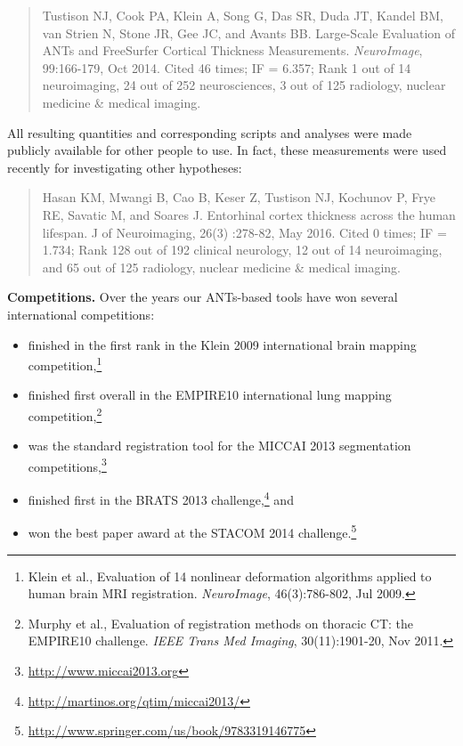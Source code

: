 \documentclass[11pt,]{article}
\let\rmarkdownfootnote\footnote%
\def\footnote{\protect\rmarkdownfootnote}
\begin{document}
\begin{quote}
Tustison NJ, Cook PA, Klein A, Song G, Das SR, Duda JT, Kandel BM, van
Strien N, Stone JR, Gee JC, and Avants BB. Large-Scale Evaluation of
ANTs and FreeSurfer Cortical Thickness Measurements. \emph{NeuroImage},
99:166-179, Oct 2014. Cited 46 times; IF = 6.357; Rank 1 out of 14
neuroimaging, 24 out of 252 neurosciences, 3 out of 125 radiology,
nuclear medicine \& medical imaging.
\end{quote}

All resulting quantities and corresponding scripts and analyses were
made publicly available for other people to use. In fact, these
measurements were used recently for investigating other hypotheses:

\begin{quote}
Hasan KM, Mwangi B, Cao B, Keser Z, Tustison NJ, Kochunov P, Frye RE,
Savatic M, and Soares J. Entorhinal cortex thickness across the human
lifespan. J of Neuroimaging, 26(3) :278-82, May 2016. Cited 0 times; IF
= 1.734; Rank 128 out of 192 clinical neurology, 12 out of 14
neuroimaging, and 65 out of 125 radiology, nuclear medicine \& medical
imaging.
\end{quote}

\textbf{Competitions.} Over the years our ANTs-based tools have won
several international competitions:

\begin{itemize}
\item
  finished in the first rank in the Klein 2009 international brain
  mapping competition,\footnote{Klein et al., Evaluation of 14 nonlinear
    deformation algorithms applied to human brain MRI registration.
    \emph{NeuroImage}, 46(3):786-802, Jul 2009.}
\item
  finished first overall in the EMPIRE10 international lung mapping
  competition,\footnote{Murphy et al., Evaluation of registration
    methods on thoracic CT: the EMPIRE10 challenge. \emph{IEEE Trans Med
    Imaging}, 30(11):1901-20, Nov 2011.}
\item
  was the standard registration tool for the MICCAI 2013 segmentation
  competitions,\footnote{\url{http://www.miccai2013.org}}
\item
  finished first in the BRATS 2013 challenge,\footnote{\url{http://martinos.org/qtim/miccai2013/}}
  and
\item
  won the best paper award at the STACOM 2014 challenge.\footnote{\url{http://www.springer.com/us/book/9783319146775}}
\end{itemize}
\end{document}
